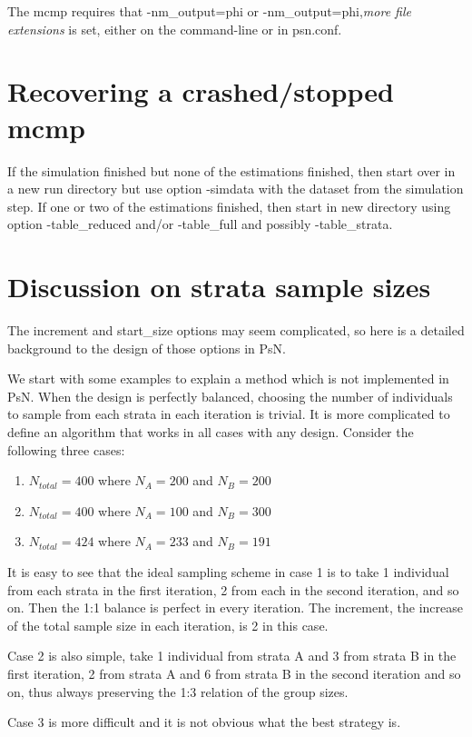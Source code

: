 The mcmp requires that -nm\_output=phi or -nm\_output=phi,\emph{more file extensions} is set, either on the command-line or in psn.conf.

\section{Recovering a crashed/stopped mcmp}
If the simulation finished but none of the estimations finished, then start over in a new run directory but use option -simdata with the dataset from the simulation step. If one or two of the estimations finished, then start in new directory using option -table\_reduced and/or -table\_full and possibly -table\_strata. 

\section{Discussion on strata sample sizes}
The increment and start\_size options may seem complicated, so here is a detailed background to the design of those options in PsN.

We start with some examples to explain a method which is not implemented in PsN. When the design is perfectly balanced, choosing the number of individuals to sample from each strata in each iteration is trivial. It is more complicated to define an algorithm that works in all cases with any design. Consider the following three cases:

\begin{enumerate}
	\item $N_{total}=400$ where $N_A=200$ and $N_B=200$
	\item $N_{total}=400$ where $N_A=100$ and $N_B=300$
	\item	$N_{total}=424$ where $N_A=233$ and $N_B=191$
\end{enumerate}
It is easy to see that the ideal sampling scheme in case 1 is to take 1 individual from each strata in the first iteration, 2 from each in the second iteration, and so on. Then the 1:1 balance is perfect in every iteration. The increment, the increase of the total sample size in each iteration, is 2 in this case.

Case 2 is also simple, take 1 individual from strata A and 3 from strata B in the first iteration, 2 from strata A and 6 from strata B in the second iteration and so on, thus always preserving the 1:3 relation of the group sizes. 

Case 3 is more difficult and it is not obvious what the best strategy is. 

